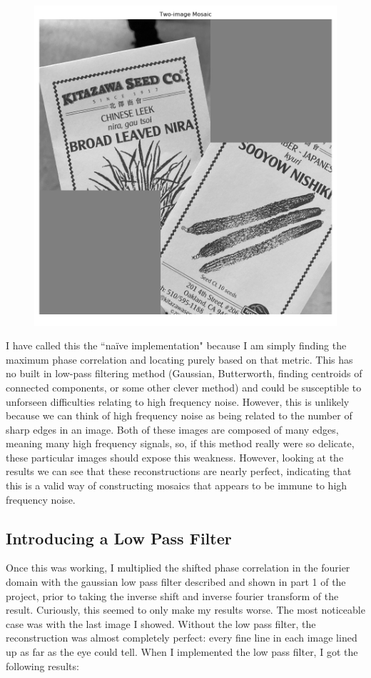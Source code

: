 \documentclass[]{article}
\begin{document}
\begin{figure}[H]
	\centering
	\includegraphics[width=6.5in]{p3_output/img_3_mosaic.png}
\end{figure}

\vskip 5pt
I have called this the ``na\"ive implementation" because I am simply finding the maximum phase correlation and locating purely based on that metric. This has no built in low-pass filtering method (Gaussian, Butterworth, finding centroids of connected components, or some other clever method) and could be susceptible to unforseen difficulties relating to high frequency noise. However, this is unlikely because we can think of high frequency noise as being related to the number of sharp edges in an image. Both of these images are composed of many edges, meaning many high frequency signals, so, if this method really were so delicate, these particular images should expose this weakness. However, looking at the results we can see that these reconstructions are nearly perfect, indicating that this is a valid way of constructing mosaics that appears to be immune to high frequency noise.
\newpage
\subsection{Introducing a Low Pass Filter}
Once this was working, I multiplied the shifted phase correlation in the fourier domain with the gaussian low pass filter described and shown in part 1 of the project, prior to taking the inverse shift and inverse fourier transform of the result. Curiously, this seemed to only make my results worse. The most noticeable case was with the last image I showed. Without the low pass filter, the reconstruction was almost completely perfect: every fine line in each image lined up as far as the eye could tell. When I implemented the low pass filter, I got the following results:
\end{document}
